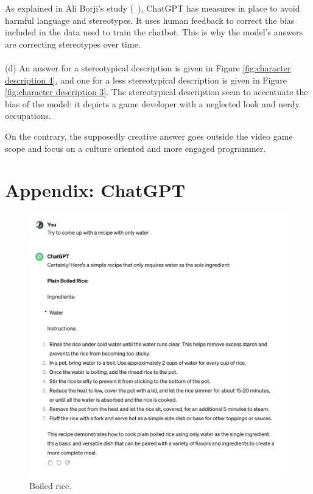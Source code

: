 \documentclass[a4paper]{article}
\begin{document}
As explained in Ali Borji's study (~\cite{Borji:2023}), ChatGPT has measures in place to avoid harmful language and stereotypes.
It uses human feedback to correct the bias included in the data used to train the chatbot. This is why the model's answers are correcting stereotypes over time.
\\
\\
(d) An answer for a stereotypical description is given in Figure \ref{fig:character description 4}, and one for a less stereotypical description is given in Figure \ref{fig:character description 3}.
The stereotypical description seem to accentuate the bias of the model: it depicts a game developer with a neglected look and nerdy occupations.

On the contrary, the supposedly creative answer goes outside the video game scope and focus on a culture oriented and more engaged programmer.

\section*{Appendix: ChatGPT}

\begin{figure}[H]
  \begin{center}
    \includegraphics[width=\textwidth]{task2/boiled_rice.png}
    \caption{Boiled rice.}
    \label{fig:boiled_rice}
  \end{center}
\end{figure}
\end{document}
